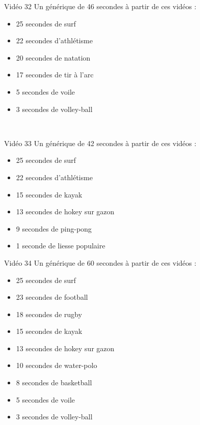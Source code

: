 \documentclass[10pt, a5paper,twoside]{article}
\begin{document}
\vfill

\begin{card}[width = \textwidth, colback = olympicviolet, colframe = olympicviolet, bottomtitle = 2mm]{Vidéo 32}
  Un générique de 46 secondes à partir de ces vidéos :
  \vspace{-1mm}\begin{itemize}
    \item 25 secondes de surf
    \item 22 secondes d'athlétisme
    \item 20 secondes de natation
    \item 17 secondes de tir à l'arc
    \item 5 secondes de voile
    \item 3 secondes de volley-ball
  \end{itemize}
\end{card}

\vfill

\clearpage
~
\vfill

\begin{card}[width = \textwidth, colback = olympicviolet, colframe = olympicviolet, bottomtitle = 2mm]{Vidéo 33}
  Un générique de 42 secondes à partir de ces vidéos :
  \vspace{-1mm}\begin{itemize}
    \item 25 secondes de surf
    \item 22 secondes d'athlétisme
    \item 15 secondes de kayak
    \item 13 secondes de hokey sur gazon
    \item 9 secondes de ping-pong
    \item 1 seconde de liesse populaire
  \end{itemize}
\end{card}

\vfill

\begin{card}[width = \textwidth, colback = olympicviolet, colframe = olympicviolet, bottomtitle = 2mm]{Vidéo 34}
  Un générique de 60 secondes à partir de ces vidéos :
  \vspace{-1mm}\begin{itemize}
    \item 25 secondes de surf
    \item 23 secondes de football
    \item 18 secondes de rugby
    \item 15 secondes de kayak
    \item 13 secondes de hokey sur gazon
    \item 10 secondes de water-polo
    \item 8 secondes de basketball
    \item 5 secondes de voile
    \item 3 secondes de volley-ball
  \end{itemize}
\end{card}
\end{document}
